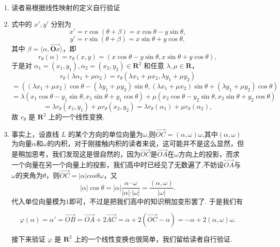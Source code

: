 \begin{solution}
    \begin{enumerate}
     \item 读者易根据线性映射的定义自行验证
     \item 式中的 \( x', y' \) 分别为
     \[
     x' = r \cos(\theta + \beta) = x \cos \theta - y \sin \theta,
     \]
     \[
     y' = r \sin(\theta + \beta) = x \sin \theta + y \cos \theta,
     \]
     其中 \( \beta = \langle \alpha, \vec{\mathbf{O}x} \rangle \)，即
     \[
     r_{\theta}(\alpha) = r_{\theta}(x, y) = (x \cos \theta - y \sin \theta, x \sin \theta + y \cos \theta),
     \]
     于是对 \( \alpha_1 = (x_1, y_1), \alpha_2 = (x_2, y_2) \in \mathbf{R}^2 \) 和任意 \( \lambda, \mu \in \mathbf{R} \)，
     \[
     r_{\theta}(\lambda \alpha_1 + \mu \alpha_2) = r_{\theta}(\lambda x_1 + \mu x_2, \lambda y_1 + \mu y_2)
     \]
     \[
     = ((\lambda x_1 + \mu x_2) \cos \theta - (\lambda y_1 + \mu y_2) \sin \theta,
     (\lambda x_1 + \mu x_2) \sin \theta + (\lambda y_1 + \mu y_2) \cos \theta)
     \]
     \[
     = \lambda (x_1 \cos \theta - y_1 \sin \theta, x_1 \sin \theta + y_1 \cos \theta)
     + \mu (x_2 \cos \theta - y_2 \sin \theta, x_2 \sin \theta + y_2 \cos \theta)
     \]
     \[
     = \lambda r_{\theta}(x_1, y_1) + \mu r_{\theta}(x_2, y_2) = \lambda r_{\theta}(\alpha_1) + \mu r_{\theta}(\alpha_2),
     \]
     故 \( r_{\theta} \) 是 \( \mathbf{R}^2 \) 上的一个线性变换.

    \item 事实上，设直线 $L$ 的某个方向的单位向量为$\omega$,则$\vec{OC}=(\alpha,\omega)\omega$,其中$(\alpha,\omega)$为向量$\alpha$和$\omega$的内积，对于刚接触内积的读者来说，这可能并不是这么显然，但是稍加思考，我们发现这是很自然的，因为$\vec{OC}$是$\vec{OA}$在$\omega$方向上的投影，而求一个向量在另一个向量上的投影，我们高中时已经见了无数遍了,不妨设$\vec{OA}$与$\omega$的夹角为$\theta$，则$\vec{OC}=\vert\alpha \vert cos\theta\omega$，又
    \[
        \vert\alpha \vert\cos\theta=\vert\alpha \vert\dfrac{\alpha\cdot\omega}{\vert \alpha\vert\cdot\vert\omega\vert}=\dfrac{(\alpha,\omega)}{\vert\omega\vert}.
    \]
    代入单位向量模为$1$即可，不过是把我们高中的知识稍加变形罢了. 于是我们有

    \[
    \varphi(\alpha)=\alpha'=\vec{OB}=\vec{OA}+2\vec{AC}= \alpha + 2(\vec{OC}-\alpha)=-\alpha+2(\alpha,\omega)\omega.
    \]

    接下来验证 $\varphi$ 是 $\mathbf{R}^2$ 上的一个线性变换也很简单，我们留给读者自行验证.


\end{enumerate}
\end{solution}

